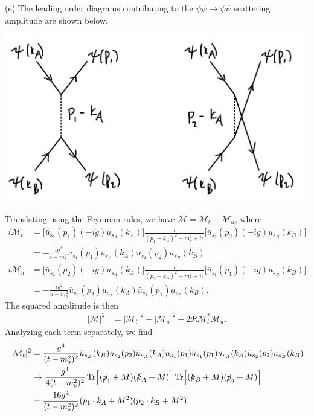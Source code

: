 {(e) The leading order diagrams contributing to the $\psi \psi \rightarrow \psi \psi$ scattering amplitude are shown below.

\begin{center}
    \includegraphics[width=0.6\linewidth]{part_e.jpeg}
\end{center}

Translating using the Feynman rules, we have $\mathcal{M} = \mathcal{M}_{t} + \mathcal{M}_{u}$, where
\begin{align}
    i \mathcal{M}_{t} &= \big[ \bar{u}_{s_1}(p_1) (-i g) u_{s_{A}}(k_{A}) \Big] \frac{i}{(p_1 - k_{A})^2 - m_{s}^2 + i \epsilon} \big[ \bar{u}_{s_2}(p_2) (-i g) u_{s_{B}}(k_{B}) \big] \nonumber \\
    &= -\frac{i g^2}{t - m_{s}^2} \bar{u}_{s_1}(p_1) u_{s_{A}}(k_{A}) \bar{u}_{s_2}(p_2) u_{s_{B}}(k_{B}) \\
%
    i \mathcal{M}_{u} &= \big[ \bar{u}_{s_2}(p_2) (-i g) u_{s_{A}}(k_{A}) \Big] \frac{i}{(p_2 - k_{A})^2 - m_{s}^2 + i \epsilon} \big[ \bar{u}_{s_1}(p_1) (-i g) u_{s_{B}}(k_{B}) \big] \nonumber \\
    &= -\frac{i g^2}{u - m_{s}^2} \bar{u}_{s_2}(p_2) u_{s_{A}}(k_{A}) \bar{u}_{s_1}(p_1) u_{s_{B}}(k_{B})
.\end{align}
The squared amplitude is then
\begin{align}
    |\mathcal{M}|^2 &= |\mathcal{M}_{t}|^2 + |\mathcal{M}_{u}|^2 + 2 \Re{ \mathcal{M}_{t}^{*} \mathcal{M}_{u} }
.\end{align}
Analyzing each term separately, we find
\begin{align}
    |\mathcal{M}_{t}|^2 &= \frac{g^{4}}{(t - m_{s}^2)^2} \bar{u}_{s_{B}}(k_{B}) u_{s_2}(p_2) \bar{u}_{s_{A}}(k_{A}) u_{s_1}(p_1) \bar{u}_{s_1}(p_1) u_{s_{A}}(k_{A}) \bar{u}_{s_2}(p_2) u_{s_{B}}(k_{B}) \nonumber \\
    &\rightarrow \frac{g^{4}}{4 (t - m_{s}^2)^2} \Tr[ (\slashed{p}_{1} + M) (\slashed{k}_{A} + M) ] \Tr[ (\slashed{k}_{B} + M) (\slashed{p}_{2} + M) ] \nonumber \\
    &= \frac{16 g^{4}}{(t - m_{s}^2)^2} ( p_1 \cdot k_{A} + M^2 ) ( p_2 \cdot k_{B} + M^2 ) \\

\end{align}}
